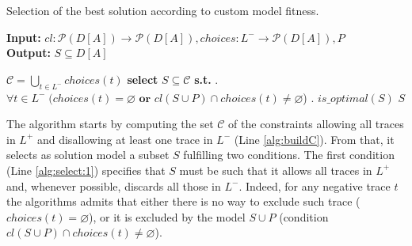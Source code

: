 \begin{algorithm}
    \caption{Selection of the best solution according to custom model fitness.}
    \label{alg:select}
    \textbf{Input:}  ${cl}: \mathcal{P}({D[A]}) \rightarrow \mathcal{P}({D[A]}), {choices} : L^- \rightarrow \mathcal{P}({D[A]}), P$\\
    \textbf{Output:} $S \subseteq D[A]$
	\begin{algorithmic}[1] 
	\State $\mathcal{C} = \bigcup_{t\in L^-} choices(t)$\label{alg:buildC}
	\State \textbf{select} $S \subseteq \mathcal{C}$ \textbf{s.t.} \label{alg:subsetC}
	\Indent
		. $\forall t \in L^- \; ({choices}(t) = \varnothing \textbf{ or } {cl}(S \cup P)\cap {choices}(t) \neq \varnothing$) 	\label{alg:select:1}
		. $is\_optimal(S)$									\label{alg:select:2}
	\EndIndent
	\State \Return $S$  %
    \EndProcedure
    \end{algorithmic}
\end{algorithm}


The algorithm starts by computing the set $\mathcal{C}$ of the constraints allowing all traces in $L^+$ and disallowing at least one trace in $L^-$ (Line \ref{alg:buildC}). From that, it selects as solution model a subset $S$ fulfilling two conditions.
%
The first condition (Line \ref{alg:select:1}) specifies that $S$ must be such that it allows all traces in $L^+$ and, whenever possible, discards all those in $L^-$. Indeed, for any negative trace $t$ the algorithms admits that either there is no way to exclude such trace ($choices(t)=\varnothing$), or it is excluded by the model $S \cup P$ (condition ${cl}(S \cup P)\cap {choices}(t) \neq \varnothing$).
%


